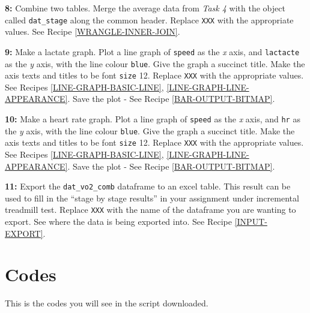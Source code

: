 \documentclass[
]{book}
\begin{document}
\textbf{8:} Combine two tables. Merge the average data from \emph{Task 4} with the object called \texttt{dat\_stage} along the common header. Replace \texttt{XXX} with the appropriate values. See Recipe \ref{WRANGLE-INNER-JOIN}.

\textbf{9:} Make a lactate graph. Plot a line graph of \texttt{speed} as the \emph{x} axis, and \texttt{lactacte} as the \emph{y} axis, with the line colour \texttt{blue}. Give the graph a succinct title. Make the axis texts and titles to be font \texttt{size} 12. Replace \texttt{XXX} with the appropriate values. See Recipes \ref{LINE-GRAPH-BASIC-LINE}, \ref{LINE-GRAPH-LINE-APPEARANCE}. Save the plot - See Recipe \ref{BAR-OUTPUT-BITMAP}.

\textbf{10:} Make a heart rate graph. Plot a line graph of \texttt{speed} as the \emph{x} axis, and \texttt{hr} as the \emph{y} axis, with the line colour \texttt{blue}. Give the graph a succinct title. Make the axis texts and titles to be font \texttt{size} 12. Replace \texttt{XXX} with the appropriate values. See Recipes \ref{LINE-GRAPH-BASIC-LINE}, \ref{LINE-GRAPH-LINE-APPEARANCE}. Save the plot - See Recipe \ref{BAR-OUTPUT-BITMAP}.

\textbf{11:} Export the \texttt{dat\_vo2\_comb} dataframe to an excel table. This result can be used to fill in the ``stage by stage results'' in your assignment under incremental treadmill test. Replace \texttt{XXX} with the name of the dataframe you are wanting to export. See where the data is being exported into. See Recipe \ref{INPUT-EXPORT}.

\hypertarget{codes}{%
\section{Codes}\label{codes}}

This is the codes you will see in the script downloaded.
\end{document}
